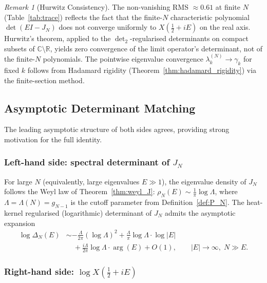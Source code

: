 \documentclass{pre-aomart}
\def\xi{X}%
\theoremstyle{plain}
\theoremstyle{definition}
\theoremstyle{remark}
\newtheorem{remark}[theorem]{Remark}
\begin{document}
\begin{remark}[Hurwitz Consistency]\label{rem:hurwitz_consistency}
The non-vanishing RMS $\approx 0.61$ at finite $N$ (Table~\ref{tab:trace})
reflects the fact that the finite-$N$ characteristic polynomial
$\det(EI - J_N)$ does not converge uniformly to $\xi(\frac12+iE)$
on the real axis.  Hurwitz's theorem, applied to the
$\det_2$-regularised determinants on compact subsets of
$\mathbb{C}\setminus\mathbb{R}$, yields zero convergence of the
limit operator's determinant, not of the finite-$N$ polynomials.
The pointwise eigenvalue convergence $\lambda_k^{(N)} \to \gamma_k$
for fixed $k$ follows from
Hadamard rigidity (Theorem~\ref{thm:hadamard_rigidity}) via the finite-section method.
\end{remark}

\subsection{Asymptotic Determinant Matching}\label{sec:asymptotic_match}

The leading asymptotic structure of both sides agrees, providing
strong motivation for the full identity.

\subsubsection{Left-hand side: spectral determinant of \texorpdfstring{$J_N$}{J\_N}}

For large $N$ (equivalently, large eigenvalues $E \gg 1$), the eigenvalue
density of $J_N$ follows the Weyl law of Theorem~\ref{thm:weyl_J}:
$\rho_N(E) \sim \frac{1}{\pi}\log\Lambda$, where $\Lambda = \Lambda(N) = g_{N-1}$
is the cutoff parameter from Definition~\ref{def:P_N}.  The heat-kernel regularised
(logarithmic) determinant of $J_N$ admits the asymptotic expansion
\begin{align}
\log\Delta_N(E) &\sim
  -\frac{\Lambda}{2\pi}(\log\Lambda)^2
  + \frac{\Lambda}{\pi}\log\Lambda \cdot \log|E| \nonumber\\
  &\quad + \frac{i\Lambda}{2\pi}\log\Lambda \cdot \arg(E)
  + O(1), \qquad |E| \to \infty,\; N \gg E. \label{eq:det_asymp}
\end{align}

\subsubsection{Right-hand side: \texorpdfstring{$\log\xi(\frac{1}{2} + iE)$}{log xi(1/2 + iE)}}
\end{document}
